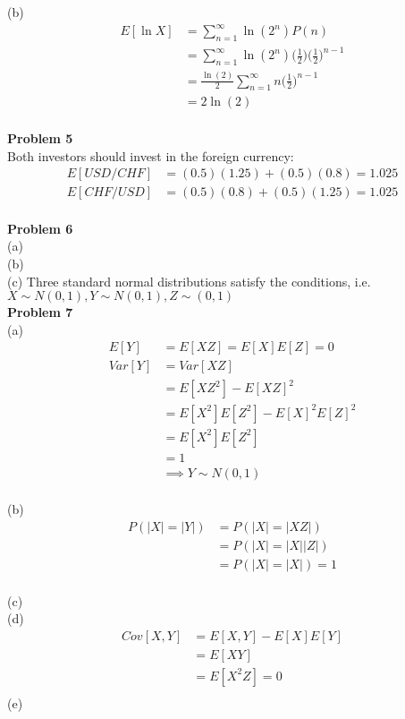 \documentclass[letterpaper,12pt]{article}
\theoremstyle{definition}
\begin{document}
(b) \begin{align*}
E[\ln X] &= \sum_{n=1}^{\infty}\ln(2^n)P(n)\\
&= \sum_{n=1}^{\infty}\ln(2^n)\Big(\frac{1}{2}\Big)\Big(\frac{1}{2}\Big)^{n-1}\\
&= \frac{\ln(2)}{2}\sum_{n=1}^{\infty}n\Big(\frac{1}{2}\Big)^{n-1}\\
&= 2\ln(2)
\end{align*}\newline\\
\noindent\textbf{Problem 5}\\
Both investors should invest in the foreign currency:
\begin{align*}
E[USD / CHF] &= (0.5)(1.25) + (0.5)(0.8) = 1.025\\
E[CHF / USD] &= (0.5)(0.8) + (0.5)(1.25) = 1.025
\end{align*}\newline\\
\noindent\textbf{Problem 6}\\
(a)\\
(b)\\
(c) Three standard normal distributions satisfy the conditions, i.e. $X\sim N(0,1), Y \sim N(0,1), Z \sim (0,1)$\\


\noindent\textbf{Problem 7}\\
(a) \begin{align*}
E[Y] &= E[XZ] = E[X]E[Z] = 0\\
Var[Y] &= Var[XZ]\\
&= E[XZ^2] - E[XZ]^2\\
&= E[X^2]E[Z^2] - E[X]^2E[Z]^2\\
&= E[X^2]E[Z^2]\\
&= 1\\
&\implies Y \sim N(0,1)
\end{align*}\\
(b) 
\begin{align*}
P(|X|=|Y|) &= P(|X|=|XZ|)\\
&=P(|X|=|X||Z|)\\
&= P(|X|=|X|) = 1
\end{align*}\\
(c)\\
(d) \begin{align*}
Cov[X,Y] &= E[X,Y]-E[X]E[Y]\\
&= E[XY]\\
&= E[X^2Z] = 0\\
\end{align*}
(e)\\
\end{document}
